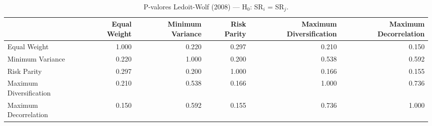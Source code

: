 \begin{table}[htbp]
  \centering
  \caption{P-valores Ledoit-Wolf (2008) — H$_0$: SR$_i$ = SR$_j$.}
  \label{tab:lw_pvalues}
  \footnotesize
  \begin{tabular}{lrrrrr}
  \toprule
  & Equal Weight & Minimum Variance & Risk Parity & Maximum Diversification & Maximum Decorrelation \\
  \midrule
  Equal Weight & 1.000 & 0.220 & 0.297 & 0.210 & 0.150 \\
  Minimum Variance & 0.220 & 1.000 & 0.200 & 0.538 & 0.592 \\
  Risk Parity & 0.297 & 0.200 & 1.000 & 0.166 & 0.155 \\
  Maximum Diversification & 0.210 & 0.538 & 0.166 & 1.000 & 0.736 \\
  Maximum Decorrelation & 0.150 & 0.592 & 0.155 & 0.736 & 1.000 \\
  \bottomrule
  \end{tabular}
\end{table}